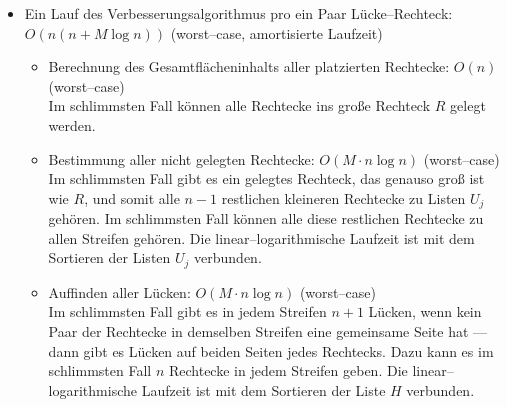 \begin{itemize}
\begin{itemize}
		\item Das Finden der genauen Stelle in den Listen $S_j$: $O(M \log n)$ (worst--case)\\
		Nicht in jedem Streifen müssen sich dieselben Rechtecke befinden und ein Rechteck 
		kann zu mehreren Steifen gehören.
		In jedem Streifen muss man die genaue Position zum Platzieren des Rechtecks finden.
		Das erfolgt mittels der eingebauten Funktion , die in C++ in $O(\log n)$ läuft.\footnote{\href{https://en.cppreference.com/w/cpp/algorithm/upper_bound}{https://en.cppreference.com/w/cpp/algorithm/upper\_bound}}.
		Die Einfügen--Operation in eine  in C++ erfolgt in $O(1)$.\footnote{\href{https://en.cppreference.com/w/cpp/container/list/insert}{https://en.cppreference.com/w/cpp/container/list/insert}}
		Im schlimmsten Fall gehört ein Rechteck zu allen Streifen, deshalb muss die endliche Laufzeit
		mal $M$ multipliziert werden.
	\end{itemize}

	\item Ein Lauf des Verbesserungsalgorithmus pro ein Paar Lücke--Rechteck: $O(n(n + M \log n))$ (worst--case, amortisierte Laufzeit)

	\begin{itemize}
		\item Berechnung des Gesamtflächeninhalts aller platzierten Rechtecke: $O(n)$ (worst--case)\\
		Im schlimmsten Fall können alle Rechtecke ins große Rechteck $R$ gelegt werden.

		\item Bestimmung aller nicht gelegten Rechtecke: $O(M \cdot n \log n)$ (worst--case)\\
		Im schlimmsten Fall gibt es ein gelegtes Rechteck, das genauso groß ist wie $R$, und somit
		alle $n-1$ restlichen kleineren Rechtecke zu Listen $U_j$ gehören. 
		Im schlimmsten Fall können alle diese restlichen Rechtecke zu allen Streifen gehören.
		Die linear--logarithmische Laufzeit ist mit dem Sortieren der Listen $U_j$ verbunden.

		\item Auffinden aller Lücken: $O(M \cdot n \log n)$ (worst--case)\\
		Im schlimmsten Fall gibt es in jedem Streifen $n+1$ Lücken, wenn kein Paar
		der Rechtecke in demselben Streifen eine gemeinsame Seite hat ---
		dann gibt es Lücken auf beiden Seiten
		jedes Rechtecks. Dazu kann es im schlimmsten Fall $n$ Rechtecke in jedem Streifen geben.
		Die linear--logarithmische Laufzeit ist mit dem Sortieren der Liste $H$ verbunden.


\end{itemize}
\end{itemize}
